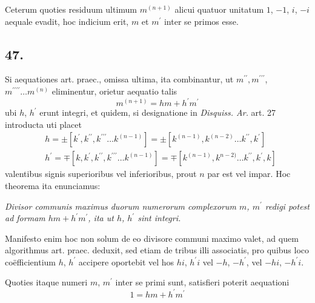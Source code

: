 \documentclass[twoside,12pt, showframe]{memoir}
\begin{document}
Ceterum quoties residuum ultimum \(m^{(n+1)}\) alicui quatuor unitatum \(1\), \(-1\), \(i\), \(-i\) aequale evadit, hoc indicium erit, \(m\) et \(m^{\prime}\) inter se primos esse.

\subsection*{47.}
 
Si aequationes art. praec., omissa ultima, ita combinantur, ut \(m^{\prime \prime}, m^{\prime \prime \prime}\), \(m^{\prime \prime \prime \prime} \ldots m^{(n)}\) eliminentur, orietur aequatio talis
\[m^{(n+1)}=h m+h^{\prime} m^{\prime}\]\clearpage\noindent%
ubi \(h\), \(h^{\prime}\) erunt integri, et quidem, si designatione in \textit{Disquiss. Ar.} art. 27 introducta uti placet
\[\begin{aligned}
& h= \pm\left[k^{\prime}, k^{\prime \prime}, k^{\prime \prime \prime} \ldots k^{(n-1)}\right]= \pm\left[k^{(n-1)}, k^{(n-2)} \ldots k^{\prime \prime}, k^{\prime}\right] \\
& h^{\prime}=\mp\left[k, k^{\prime}, k^{\prime \prime}, k^{\prime \prime \prime} \ldots k^{(n-1)}\right]=\mp\left[k^{(n-1)}, k^{n-2)} \ldots k^{\prime \prime}, k^{\prime}, k\right]
\end{aligned}\]
valentibus signis superioribus vel inferioribus, prout \(n\) par est vel impar. Hoc theorema ita enunciamus:
 
\textit{Divisor communis maximus duorum numerorum complexorum \(m\), \(m^{\prime}\) redigi potest ad formam \(h m+h^{\prime} m^{\prime}\), ita ut \(h\), \(h^{\prime}\) sint integri.}

Manifesto enim hoc non solum de eo divisore communi maximo valet, ad quem algorithmus art. praec. deduxit, sed etiam de tribus illi associatis, pro quibus loco coëfficientium \(h\), \(h^{\prime}\) accipere oportebit vel hos \(h i\), \(h^{\prime} i\) vel \(-h\), \(-h^{\prime}\), vel \(-h i\), \(-h^{\prime} i\).
 
Quoties itaque numeri \(m\), \(m^{\prime}\) inter se primi sunt, satisfieri poterit aequationi
\[1=h m+h^{\prime} m^{\prime}\]
\end{document}
